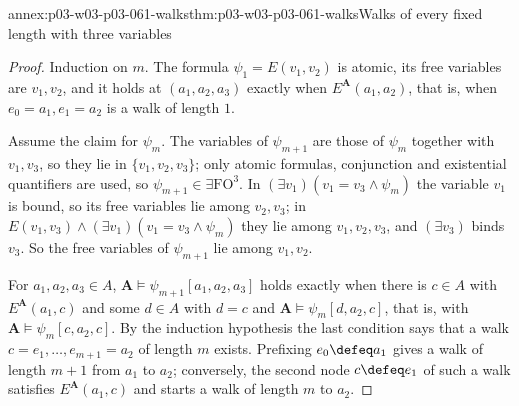 \begin{annexitem}{annex:p03-w03-p03-061-walks}{thm:p03-w03-p03-061-walks}{Walks of every fixed length with three variables}
\begin{proof}
Induction on \(m\). The formula \(\psi_1=E(v_1,v_2)\) is atomic, its free
variables are \(v_1,v_2\), and it holds at \((a_1,a_2,a_3)\) exactly when
\(E^{\mathbf A}(a_1,a_2)\), that is, when \(e_0=a_1,e_1=a_2\) is a walk of
length \(1\).

Assume the claim for \(\psi_m\). The variables of \(\psi_{m+1}\) are those
of \(\psi_m\) together with \(v_1,v_3\), so they lie in \(\{v_1,v_2,v_3\}\);
only atomic formulas, conjunction and existential quantifiers are used, so
\(\psi_{m+1}\in\exists\mathrm{FO}^3\). In
\((\exists v_1)(v_1=v_3\wedge\psi_m)\) the variable \(v_1\) is bound, so its
free variables lie among \(v_2,v_3\); in \(E(v_1,v_3)\wedge(\exists
v_1)(v_1=v_3\wedge\psi_m)\) they lie among \(v_1,v_2,v_3\), and
\((\exists v_3)\) binds \(v_3\). So the free variables of \(\psi_{m+1}\) lie
among \(v_1,v_2\).

For \(a_1,a_2,a_3\in A\), \(\mathbf A\models\psi_{m+1}[a_1,a_2,a_3]\) holds
exactly when there is \(c\in A\) with \(E^{\mathbf A}(a_1,c)\) and some
\(d\in A\) with \(d=c\) and \(\mathbf A\models\psi_m[d,a_2,c]\), that is,
with \(\mathbf A\models\psi_m[c,a_2,c]\). By the induction hypothesis the last
condition says that a walk \(c=e_1,\ldots,e_{m+1}=a_2\) of length \(m\)
exists. Prefixing \(e_0\defeq a_1\) gives a walk of length \(m+1\) from
\(a_1\) to \(a_2\); conversely, the second node \(c\defeq e_1\) of such a
walk satisfies \(E^{\mathbf A}(a_1,c)\) and starts a walk of length \(m\) to
\(a_2\).
\end{proof}
\end{annexitem}


